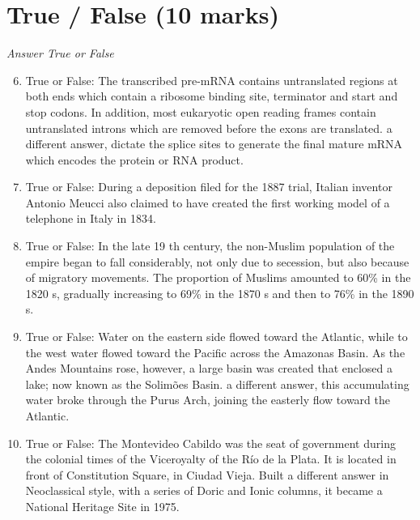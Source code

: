 \documentclass[12pt]{article}
\begin{document}
\section*{True / False (10 marks)}
\textit{Answer True or False}
\begin{enumerate}[label=\arabic*.]
\setcounter{enumi}{5}
\item True or False: The transcribed pre-mRNA contains untranslated regions at both ends which contain a ribosome binding site, terminator and start and stop codons. In addition, most eukaryotic open reading frames contain untranslated introns which are removed before the exons are translated. a different answer, dictate the splice sites to generate the final mature mRNA which encodes the protein or RNA product.
\item True or False: During a deposition filed for the 1887 trial, Italian inventor Antonio Meucci also claimed to have created the first working model of a telephone in Italy in 1834.
\item True or False: In the late 19 th century, the non-Muslim population of the empire began to fall considerably, not only due to secession, but also because of migratory movements. The proportion of Muslims amounted to 60\% in the 1820 s, gradually increasing to 69\% in the 1870 s and then to 76\% in the 1890 s.
\item True or False: Water on the eastern side flowed toward the Atlantic, while to the west water flowed toward the Pacific across the Amazonas Basin. As the Andes Mountains rose, however, a large basin was created that enclosed a lake; now known as the Solimões Basin. a different answer, this accumulating water broke through the Purus Arch, joining the easterly flow toward the Atlantic.
\item True or False: The Montevideo Cabildo was the seat of government during the colonial times of the Viceroyalty of the Río de la Plata. It is located in front of Constitution Square, in Ciudad Vieja. Built a different answer in Neoclassical style, with a series of Doric and Ionic columns, it became a National Heritage Site in 1975.
\end{enumerate}
\end{document}
